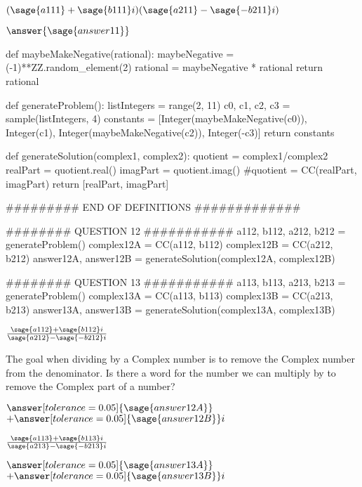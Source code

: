\documentclass{ximera}
\begin{document}
\begin{question}
	$(\sage{a111}+\sage{b111}i)(\sage{a211}-\sage{-b211}i)$ 
	
	$\answer{\sage{answer11}}$
\end{question}

\begin{sagesilent}
def maybeMakeNegative(rational):
    maybeNegative = (-1)**ZZ.random_element(2)
    rational = maybeNegative * rational
    return rational

def generateProblem():
    listIntegers = range(2, 11)
    c0, c1, c2, c3 = sample(listIntegers, 4)
    constants = [Integer(maybeMakeNegative(c0)), Integer(c1), Integer(maybeMakeNegative(c2)), Integer(-c3)]
    return constants

def generateSolution(complex1, complex2):
    quotient = complex1/complex2
    realPart = quotient.real()
    imagPart = quotient.imag()
    #quotient = CC(realPart, imagPart)
    return [realPart, imagPart]

######### END OF DEFINITIONS #############

######## QUESTION 12 ###########
a112, b112, a212, b212 = generateProblem()
complex12A = CC(a112, b112)
complex12B = CC(a212, b212)
answer12A, answer12B = generateSolution(complex12A, complex12B)

######## QUESTION 13 ###########
a113, b113, a213, b213 = generateProblem()
complex13A = CC(a113, b113)
complex13B = CC(a213, b213)
answer13A, answer13B = generateSolution(complex13A, complex13B)
\end{sagesilent}

\begin{question}
	$\frac{\sage{a112}+\sage{b112}i}{\sage{a212}-\sage{-b212}i}$ 

\begin{hint}
The goal when dividing by a Complex number is to remove the Complex number from the denominator. Is there a word for the number we can multiply by to remove the Complex part of a number?
\end{hint}
	
	$\answer[tolerance=0.05]{\sage{answer12A}}$ $+ \answer[tolerance=0.05]{\sage{answer12B}}i$
\end{question}

\begin{question}
	$\frac{\sage{a113}+\sage{b113}i}{\sage{a213}-\sage{-b213}i}$ 
	
	$\answer[tolerance=0.05]{\sage{answer13A}}$ $+ \answer[tolerance=0.05]{\sage{answer13B}}i$
\end{question}
\end{document}
